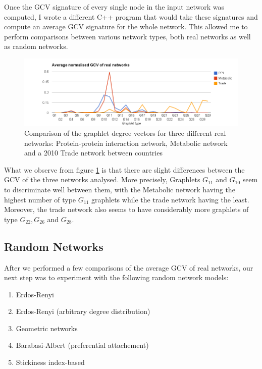 Once the GCV signature of every single node in the input network was
computed, I wrote a different C++ program that would take these signatures and
compute an average GCV signature for the whole network. This allowed me to
perform comparisons between various network types, both real networks as well
as random networks.


\begin{figure}[h]
  \centering
\includegraphics[scale=0.5]{charts/1-avg-norm-ppi-all.png}
\caption{Comparison of the graphlet degree vectors for three different
real networks: Protein-protein interaction network, Metabolic network and 
a 2010 Trade network between countries}
\label{fig:avg_gdv_real}
\end{figure}

What we observe from figure \ref{fig:avg_gdv_real} is that there are slight
differences between the GCV of the three networks analysed. More precisely,
Graphlets $ G_{11} $ and $ G_{10} $ seem to discriminate well between them,
with the Metabolic network having the highest number of type $ G_{11}$ graphlets
while the trade network having the least. Moreover, the trade network also seems
to have considerably more graphlets of type $ G_{22}, G_{26} $ and $ G_{28}$. 


\subsection{Random Networks}

After we performed a few comparisons of the average GCV of real networks, our
next step was to experiment with the following random network models:
 \begin{enumerate}
    \item Erdos-Renyi\cite{erdHos1959random}
    \item Erdos-Renyi (arbitrary degree distribution)
    \item Geometric networks\cite{penrose2003random}
    \item Barabasi-Albert (preferential attachement)\cite{barabasi1999emergence}
    \item Stickiness index-based\cite{prvzulj2006modelling}
  \end{enumerate}

